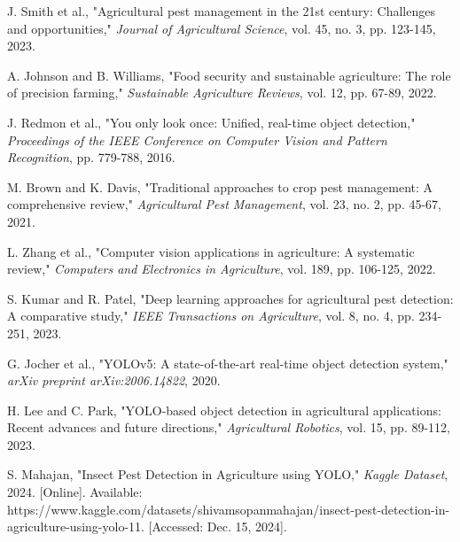 \documentclass[conference]{IEEEtran}
\begin{document}
\begin{thebibliography}{00}
 J. Smith et al., "Agricultural pest management in the 21st century: Challenges and opportunities," \textit{Journal of Agricultural Science}, vol. 45, no. 3, pp. 123-145, 2023.

 A. Johnson and B. Williams, "Food security and sustainable agriculture: The role of precision farming," \textit{Sustainable Agriculture Reviews}, vol. 12, pp. 67-89, 2022.

 J. Redmon et al., "You only look once: Unified, real-time object detection," \textit{Proceedings of the IEEE Conference on Computer Vision and Pattern Recognition}, pp. 779-788, 2016.

 M. Brown and K. Davis, "Traditional approaches to crop pest management: A comprehensive review," \textit{Agricultural Pest Management}, vol. 23, no. 2, pp. 45-67, 2021.

 L. Zhang et al., "Computer vision applications in agriculture: A systematic review," \textit{Computers and Electronics in Agriculture}, vol. 189, pp. 106-125, 2022.

 S. Kumar and R. Patel, "Deep learning approaches for agricultural pest detection: A comparative study," \textit{IEEE Transactions on Agriculture}, vol. 8, no. 4, pp. 234-251, 2023.

 G. Jocher et al., "YOLOv5: A state-of-the-art real-time object detection system," \textit{arXiv preprint arXiv:2006.14822}, 2020.

 H. Lee and C. Park, "YOLO-based object detection in agricultural applications: Recent advances and future directions," \textit{Agricultural Robotics}, vol. 15, pp. 89-112, 2023.

 S. Mahajan, "Insect Pest Detection in Agriculture using YOLO," \textit{Kaggle Dataset}, 2024. [Online]. Available: https://www.kaggle.com/datasets/shivamsopanmahajan/insect-pest-detection-in-agriculture-using-yolo-11. [Accessed: Dec. 15, 2024].

\end{thebibliography}
\end{document}
